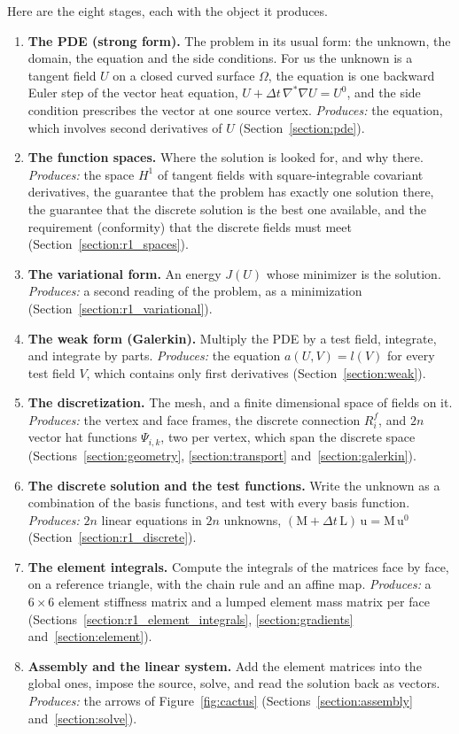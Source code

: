 Here are the eight stages, each with the object it produces.
\begin{enumerate}
\item \textbf{The PDE (strong form).} The problem in its usual form: the unknown, the domain, the equation and the side conditions. For us the unknown is a tangent field $U$ on a closed curved surface $\Omega$, the equation is one backward Euler step of the vector heat equation, $U + \Delta t\, \nabla^*\nabla U = U^0$, and the side condition prescribes the vector at one source vertex. \emph{Produces:} the equation, which involves second derivatives of $U$ (Section~\ref{section:pde}).
\item \textbf{The function spaces.} Where the solution is looked for, and why there. \emph{Produces:} the space $H^1$ of tangent fields with square-integrable covariant derivatives, the guarantee that the problem has exactly one solution there, the guarantee that the discrete solution is the best one available, and the requirement (conformity) that the discrete fields must meet (Section~\ref{section:r1_spaces}).
\item \textbf{The variational form.} An energy $J(U)$ whose minimizer is the solution. \emph{Produces:} a second reading of the problem, as a minimization (Section~\ref{section:r1_variational}).
\item \textbf{The weak form (Galerkin).} Multiply the PDE by a test field, integrate, and integrate by parts. \emph{Produces:} the equation $a(U, V) = l(V)$ for every test field $V$, which contains only first derivatives (Section~\ref{section:weak}).
\item \textbf{The discretization.} The mesh, and a finite dimensional space of fields on it. \emph{Produces:} the vertex and face frames, the discrete connection $R_i^f$, and $2n$ vector hat functions $\Psi_{i,k}$, two per vertex, which span the discrete space (Sections~\ref{section:geometry}, \ref{section:transport} and~\ref{section:galerkin}).
\item \textbf{The discrete solution and the test functions.} Write the unknown as a combination of the basis functions, and test with every basis function. \emph{Produces:} $2n$ linear equations in $2n$ unknowns, $(\mathrm M + \Delta t\,\mathrm L)\,\mathrm u = \mathrm M\,\mathrm u^0$ (Section~\ref{section:r1_discrete}).
\item \textbf{The element integrals.} Compute the integrals of the matrices face by face, on a reference triangle, with the chain rule and an affine map. \emph{Produces:} a $6\times 6$ element stiffness matrix and a lumped element mass matrix per face (Sections~\ref{section:r1_element_integrals}, \ref{section:gradients} and~\ref{section:element}).
\item \textbf{Assembly and the linear system.} Add the element matrices into the global ones, impose the source, solve, and read the solution back as vectors. \emph{Produces:} the arrows of Figure~\ref{fig:cactus} (Sections~\ref{section:assembly} and~\ref{section:solve}).
\end{enumerate}

